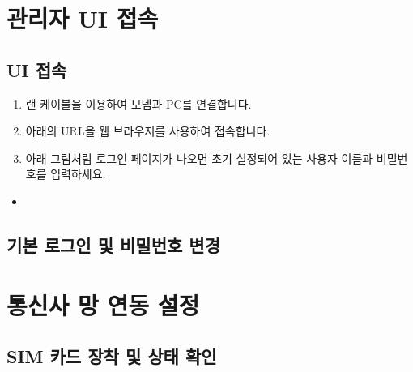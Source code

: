\documentclass[letterpaper,10pt,english]{sphinxmanual}
\begin{document}
\sphinxstepscope


\section{관리자 UI 접속}
\label{\detokenize{howto/administrator:ui}}\label{\detokenize{howto/administrator::doc}}

\subsection{UI 접속}
\label{\detokenize{howto/administrator:id1}}\begin{enumerate}
%
\item {} 
\sphinxAtStartPar
랜 케이블을 이용하여 모뎀과 PC를 연결합니다.

\item {} 
\sphinxAtStartPar
아래의 URL을 웹 브라우저를 사용하여 접속합니다.

\item {} 
\sphinxAtStartPar
아래 그림처럼 로그인 페이지가 나오면 초기 설정되어 있는 사용자 이름과 비밀번호를 입력하세요.

\end{enumerate}
\begin{itemize}
\item {} 
\sphinxAtStartPar
{}

\end{itemize}

\noindent{}


\subsection{기본 로그인 및 비밀번호 변경}
\label{\detokenize{howto/administrator:id2}}
\noindent{}

\sphinxstepscope


\section{통신사 망 연동 설정}
\label{\detokenize{howto/connection:id1}}\label{\detokenize{howto/connection::doc}}

\subsection{SIM 카드 장착 및 상태 확인}
\label{\detokenize{howto/connection:sim}}
\noindent{}
\end{document}
